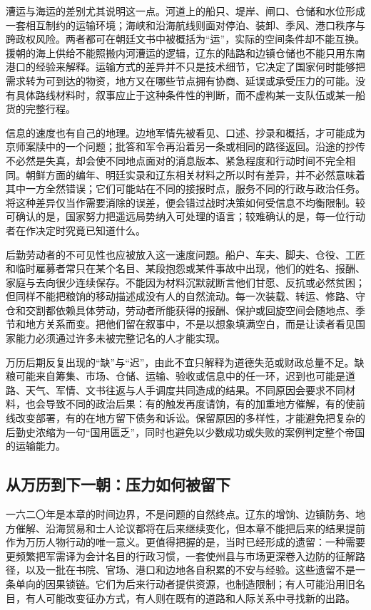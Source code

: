 漕运与海运的差别尤其说明这一点。河道上的船只、堤岸、闸口、仓储和水位形成一套相互制约的运输环境；海峡和沿海航线则面对停泊、装卸、季风、港口秩序与跨政权风险。两者都可在朝廷文书中被概括为“运”，实际的空间条件却不能互换。援朝的海上供给不能照搬内河漕运的逻辑，辽东的陆路和边镇仓储也不能只用东南港口的经验来解释。运输方式的差异并不只是技术细节，它决定了国家何时能够把需求转为可到达的物资，地方又在哪些节点拥有协商、延误或承受压力的可能。没有具体路线材料时，叙事应止于这种条件性的判断，而不虚构某一支队伍或某一船货的完整行程。

信息的速度也有自己的地理。边地军情先被看见、口述、抄录和概括，才可能成为京师案牍中的一个问题；批答和军令再沿着另一条或相同的路径返回。沿途的抄传不必然是失真，却会使不同地点面对的消息版本、紧急程度和行动时间不完全相同。朝鲜方面的编年、明廷实录和辽东相关材料之所以时有差异，并不必然意味着其中一方全然错误；它们可能站在不同的接报时点，服务不同的行政与政治任务。将这种差异仅当作需要消除的误差，便会错过战时决策如何受信息不均衡限制。较可确认的是，国家努力把遥远局势纳入可处理的语言；较难确认的是，每一位行动者在作决定时究竟已知道什么。

后勤劳动者的不可见性也应被放入这一速度问题。船户、车夫、脚夫、仓役、工匠和临时雇募者常只在某个名目、某段抱怨或某件事故中出现，他们的姓名、报酬、家庭与去向很少连续保存。不能因为材料沉默就断言他们甘愿、反抗或必然贫困；但同样不能把粮饷的移动描述成没有人的自然流动。每一次装载、转运、修路、守仓和交割都依赖具体劳动，劳动者所能获得的报酬、保护或回旋空间会随地点、季节和地方关系而变。把他们留在叙事中，不是以想象填满空白，而是让读者看见国家能力必须通过许多未被完整记名的人才能实现。

万历后期反复出现的“缺”与“迟”，由此不宜只解释为道德失范或财政总量不足。缺粮可能来自筹集、市场、仓储、运输、验收或信息中的任一环，迟到也可能是道路、天气、军情、文书往返与人手调度共同造成的结果。不同原因会要求不同材料，也会导致不同的政治后果：有的触发再度请饷，有的加重地方催解，有的使前线改变部署，有的在地方留下债务和诉讼。保留原因的多样性，才能避免把复杂的后勤史浓缩为一句“国用匮乏”，同时也避免以少数成功或失败的案例判定整个帝国的运输能力。

\subsection{从万历到下一朝：压力如何被留下}

一六二〇年是本章的时间边界，不是问题的自然终点。辽东的增饷、边镇防务、地方催解、沿海贸易和士人论议都将在后来继续变化，但本章不能把后来的结果提前作为万历人物行动的唯一意义。更值得把握的是，当时已经形成的遗留：一种需要更频繁把军需译为会计名目的行政习惯，一套使州县与市场更深卷入边防的征解路径，以及一批在书院、官场、港口和边地各自积累的不安与经验。这些遗留不是一条单向的因果锁链。它们为后来行动者提供资源，也制造限制；有人可能沿用旧名目，有人可能改变征办方式，有人则在既有的道路和人际关系中寻找新的出路。

